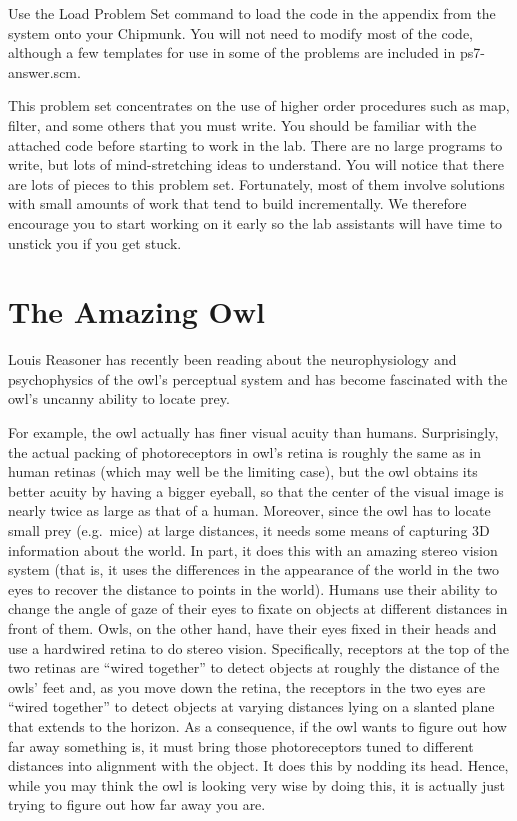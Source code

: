 Use the {\cf Load Problem Set} command to load the code in the appendix from
the system onto your Chipmunk.  You will not need to modify most of the
code, although a few templates for use in some of the problems are
included in {\cf ps7-answer.scm}.

This problem set concentrates on the use of 
higher order procedures such as {\cf map}, {\cf filter}, and some others that
you must
write.  You should be familiar with the attached code before starting to work
in the lab.  There are no large programs to write, but lots of mind-stretching
ideas to understand.  You will notice that there are lots of pieces to
this problem set.  Fortunately, most of them involve solutions with small
amounts of work that tend to build incrementally. We therefore encourage you to
start working on it early so the lab assistants will have time to unstick you
if you get stuck.

\section{The Amazing Owl}

Louis Reasoner has recently been reading about the neurophysiology and
psychophysics of the owl's perceptual system and has become
fascinated with the owl's uncanny ability to locate prey.

For
example, the owl actually has finer visual acuity than humans. 
Surprisingly, the actual packing of photoreceptors in owl's retina is
roughly the same as in human retinas (which may well be the limiting
case), but the owl obtains its better acuity by having a bigger eyeball,
so that the center of the visual image is nearly twice as large as that
of a human.  Moreover, since the owl has to locate small prey (e.g.~mice) at
large distances, it needs some means of capturing 3D information about the
world.  In part, it does this with an amazing stereo vision system (that
is, it uses the differences in the appearance of the world in the two eyes
to recover the distance to points in the world).  Humans use their
ability to change the angle of gaze of their eyes to fixate on objects 
at different distances in front of them.  Owls, on the other hand, have
their eyes fixed in their heads and use a hardwired retina to do stereo
vision.  Specifically, receptors at the top of the two retinas are ``wired
together'' to detect objects at roughly the distance of the owls' feet
and, as you move down the retina, the receptors in the two eyes are
``wired together'' to detect objects at varying distances lying on a
slanted plane that extends to the horizon.  As a consequence, if the owl
wants to figure out how far away something is, it must bring those
photoreceptors tuned to different distances into alignment with the
object. It does this by nodding its head.  Hence, while you may
think the owl is looking very wise by doing this, it is actually just
trying to figure out how far away you are.

